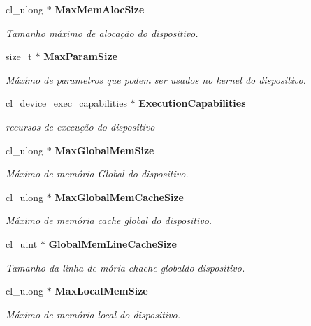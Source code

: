 \begin{DoxyCompactItemize}
cl\+\_\+ulong $\ast$ \textbf{ Max\+Mem\+Aloc\+Size}
\begin{DoxyCompactList}\small\item\em Tamanho máximo de alocação do dispositivo. \end{DoxyCompactList}\item 
\mbox{\label{structdevices_ab4f9581fce5ea973d57f55dafb765831}} 
size\+\_\+t $\ast$ \textbf{ Max\+Param\+Size}
\begin{DoxyCompactList}\small\item\em Máximo de parametros que podem ser usados no kernel do dispositivo. \end{DoxyCompactList}\item 
\mbox{\label{structdevices_a6822d80f6f4973a4ce8644c186297087}} 
cl\+\_\+device\+\_\+exec\+\_\+capabilities $\ast$ \textbf{ Execution\+Capabilities}
\begin{DoxyCompactList}\small\item\em recursos de execução do dispositivo \end{DoxyCompactList}\item 
\mbox{\label{structdevices_a5ddc90720316ce7161f26263d83d4693}} 
cl\+\_\+ulong $\ast$ \textbf{ Max\+Global\+Mem\+Size}
\begin{DoxyCompactList}\small\item\em Máximo de memória Global do dispositivo. \end{DoxyCompactList}\item 
\mbox{\label{structdevices_a75e0abd182f71d9ccdacaefa759183e1}} 
cl\+\_\+ulong $\ast$ \textbf{ Max\+Global\+Mem\+Cache\+Size}
\begin{DoxyCompactList}\small\item\em Máximo de memória cache global do dispositivo. \end{DoxyCompactList}\item 
\mbox{\label{structdevices_a6d9b4864fa0e86b5cfac50c34ed49bd3}} 
cl\+\_\+uint $\ast$ \textbf{ Global\+Mem\+Line\+Cache\+Size}
\begin{DoxyCompactList}\small\item\em Tamanho da linha de mória chache globaldo dispositivo. \end{DoxyCompactList}\item 
\mbox{\label{structdevices_a55b41f48a237ce3e06b0d5f68f518ae9}} 
cl\+\_\+ulong $\ast$ \textbf{ Max\+Local\+Mem\+Size}
\begin{DoxyCompactList}\small\item\em Máximo de memória local do dispositivo. \end{DoxyCompactList}\item 

\end{DoxyCompactItemize}
